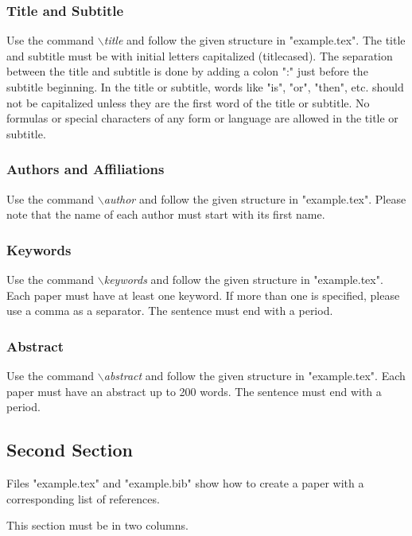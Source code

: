 \documentclass[a4paper,twoside]{article}
\begin{document}
\subsubsection{Title and Subtitle}

Use the command \textit{$\backslash$title} and follow the given structure in "example.tex". The title and subtitle must be with initial letters
capitalized (titlecased). The separation between the title and subtitle is done by adding a colon ":" just before the subtitle beginning. In the title or subtitle, words like "is", "or", "then", etc. should not be capitalized unless they are the first word of the title or subtitle. No formulas or special characters of any form or language are allowed in the title or subtitle.

\subsubsection{Authors and Affiliations}

Use the command \textit{$\backslash$author} and follow the given structure in "example.tex". Please note that the name of each author must start with its first name.

\subsubsection{Keywords}

Use the command \textit{$\backslash$keywords} and follow the given structure in "example.tex". Each paper must have at least one keyword. If more than one is specified, please use a comma as a separator. The sentence must end with a period.

\subsubsection{Abstract}

Use the command \textit{$\backslash$abstract} and follow the given structure in "example.tex".
Each paper must have an abstract up to 200 words. The sentence
must end with a period.

\subsection{Second Section}

Files "example.tex" and "example.bib" show how to create a paper
with a corresponding list of references.

This section must be in two columns.
\end{document}
